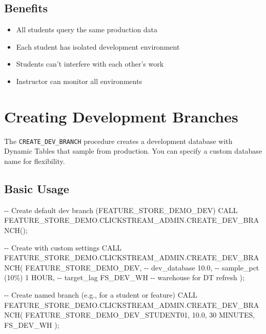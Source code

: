 \documentclass[
  letterpaper,
  DIV=11,
  numbers=noendperiod]{scrreprt}
\newenvironment{Shaded}{\begin{snugshade}}{\end{snugshade}}
\newcommand{\CommentTok}[1]{\textcolor[rgb]{0.37,0.37,0.37}{#1}}
\newcommand{\FloatTok}[1]{\textcolor[rgb]{0.68,0.00,0.00}{#1}}
\newcommand{\KeywordTok}[1]{\textcolor[rgb]{0.00,0.23,0.31}{#1}}
\newcommand{\NormalTok}[1]{\textcolor[rgb]{0.00,0.23,0.31}{#1}}
\newcommand{\StringTok}[1]{\textcolor[rgb]{0.13,0.47,0.30}{#1}}
\providecommand{\tightlist}{%
  \setlength{\itemsep}{0pt}\setlength{\parskip}{0pt}}\usepackage{longtable,booktabs,array}
\begin{document}
\hypertarget{benefits}{%
\subsection{Benefits}\label{benefits}}

\begin{itemize}
\tightlist
\item
  All students query the same production data
\item
  Each student has isolated development environment
\item
  Students can't interfere with each other's work
\item
  Instructor can monitor all environments
\end{itemize}

\hypertarget{creating-development-branches}{%
\section{Creating Development
Branches}\label{creating-development-branches}}

The \texttt{CREATE\_DEV\_BRANCH} procedure creates a development
database with Dynamic Tables that sample from production. You can
specify a custom database name for flexibility.

\hypertarget{basic-usage-1}{%
\subsection{Basic Usage}\label{basic-usage-1}}

\begin{Shaded}
\begin{Highlighting}[]
\CommentTok{{-}{-} Create default dev branch (FEATURE\_STORE\_DEMO\_DEV)}
\KeywordTok{CALL}\NormalTok{ FEATURE\_STORE\_DEMO.CLICKSTREAM\_ADMIN.CREATE\_DEV\_BRANCH();}

\CommentTok{{-}{-} Create with custom settings}
\KeywordTok{CALL}\NormalTok{ FEATURE\_STORE\_DEMO.CLICKSTREAM\_ADMIN.CREATE\_DEV\_BRANCH(}
    \StringTok{\textquotesingle{}FEATURE\_STORE\_DEMO\_DEV\textquotesingle{}}\NormalTok{,                    }\CommentTok{{-}{-} dev\_database}
    \FloatTok{10.0}\NormalTok{,                                }\CommentTok{{-}{-} sample\_pct (10\%)}
    \StringTok{\textquotesingle{}1 HOUR\textquotesingle{}}\NormalTok{,                           }\CommentTok{{-}{-} target\_lag}
    \StringTok{\textquotesingle{}FS\_DEV\_WH\textquotesingle{}}     \CommentTok{{-}{-} warehouse for DT refresh}
\NormalTok{);}

\CommentTok{{-}{-} Create named branch (e.g., for a student or feature)}
\KeywordTok{CALL}\NormalTok{ FEATURE\_STORE\_DEMO.CLICKSTREAM\_ADMIN.CREATE\_DEV\_BRANCH(}
    \StringTok{\textquotesingle{}FEATURE\_STORE\_DEMO\_DEV\_STUDENT01\textquotesingle{}}\NormalTok{,}
    \FloatTok{10.0}\NormalTok{,}
    \StringTok{\textquotesingle{}30 MINUTES\textquotesingle{}}\NormalTok{,}
    \StringTok{\textquotesingle{}FS\_DEV\_WH\textquotesingle{}}
\NormalTok{);}
\end{Highlighting}
\end{Shaded}
\end{document}
